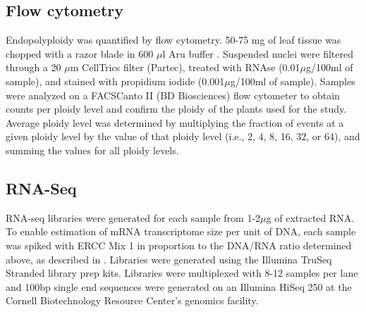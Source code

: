 \documentclass[11pt]{article}
\begin{document}
\subsection*{Flow cytometry}
Endopolyploidy was quantified by flow cytometry. 50-75 mg of leaf tissue was chopped with a razor blade in 600 $\mu$l Aru buffer \citep{arumuganathan1991}. Suspended nuclei were filtered through a 20 $\mu$m CellTrics filter (Partec), treated with RNAse (0.01$\mu$g/100ml of sample), and stained with propidium iodide (0.001$\mu$g/100ml of sample). Samples were analyzed on a FACSCanto II (BD Biosciences) flow cytometer to obtain counts per ploidy level and confirm the ploidy of the plants used for the study. Average ploidy level was determined by multiplying the fraction of events at a given ploidy level by the value of that ploidy level (i.e., 2, 4, 8, 16, 32, or 64), and summing the values for all ploidy levels.

\subsection*{RNA-Seq}
RNA-seq libraries were generated for each sample from 1-2$\mu$g of extracted RNA. To enable estimation of mRNA transcriptome size per unit of DNA, each sample was spiked with ERCC Mix 1 in proportion to the DNA/RNA ratio determined above, as described in \cite{robinson2018}. Libraries were generated using the Illumina TruSeq Stranded library prep kits. Libraries were multiplexed with 8-12 samples per lane and 100bp single end sequences were generated on an Illumina HiSeq 250 at the Cornell Biotechnology Resource Center's genomics facility.
\end{document}
